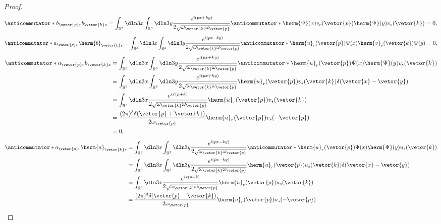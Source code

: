 \begin{proof}
\begin{equation*}
      \anticommutator*{b_{\vetor{p}r}}{b_{\vetor{k}s}} = \int_{\mathbb{R}^3} \dln3x \int_{\mathbb{R}^3} \dln3y \frac{e^{i(px + ky)}}{2\sqrt{\omega_{\vetor{k}} \omega_{\vetor{p}}}} \anticommutator*{\herm{\Psi}(x)v_r(\vetor{p})}{\herm{\Psi}(y)v_s(\vetor{k})} = 0,
   \end{equation*}
   \begin{align*}
      \anticommutator*{a_{\vetor{p}r}}{\herm{b}_{\vetor{k}s}} = \int_{\mathbb{R}^3} \dln3x \int_{\mathbb{R}^3} \dln3y \frac{e^{i(px - ky)}}{2\sqrt{\omega_{\vetor{k}} \omega_{\vetor{p}}}} \anticommutator*{\herm{u}_r(\vetor{p})\Psi(x)}{\herm{v}_s(\vetor{k})\Psi(y)} = 0,
   \end{align*}
   \begin{align*}
      \anticommutator*{a_{\vetor{p}r}}{b_{\vetor{k}s}} 
      &= \int_{\mathbb{R}^3} \dln3x \int_{\mathbb{R}^3} \dln3y \frac{e^{i(px + ky)}}{2\sqrt{\omega_{\vetor{k}} \omega_{\vetor{p}}}} \anticommutator*{\herm{u}_r(\vetor{p})\Psi(x)}{\herm{\Psi}(y)v_s(\vetor{k})}\\
      &= \int_{\mathbb{R}^3} \dln3x \int_{\mathbb{R}^3} \dln3y \frac{e^{i(px + ky)}}{2\sqrt{\omega_{\vetor{k}} \omega_{\vetor{p}}}} \herm{u}_r(\vetor{p}) v_s(\vetor{k}) \delta(\vetor{x} - \vetor{y})\\
      &= \int_{\mathbb{R}^3} \dln3x \frac{e^{ix(p + k)}}{2\sqrt{\omega_{\vetor{k}} \omega_{\vetor{p}}}} \herm{u}_r(\vetor{p}) v_s(\vetor{k})\\
      &= \frac{(2\pi)^3 \delta(\vetor{p} + \vetor{k})}{2 \omega_{\vetor{p}}} \herm{u}_r(\vetor{p}) v_s(-\vetor{p})\\
      &= 0,
   \end{align*}
   \begin{align*}
      \anticommutator*{a_{\vetor{p}r}}{\herm{a}_{\vetor{k}s}} 
      &= \int_{\mathbb{R}^3} \dln3x \int_{\mathbb{R}^3} \dln3y \frac{e^{i(px - ky)}}{2\sqrt{\omega_{\vetor{k}} \omega_{\vetor{p}}}} \anticommutator*{\herm{u}_r(\vetor{p})\Psi(x)}{\herm{\Psi}(y) u_s(\vetor{k})}\\
      &= \int_{\mathbb{R}^3} \dln3x \int_{\mathbb{R}^3} \dln3y \frac{e^{i(px - ky)}}{2\sqrt{\omega_{\vetor{k}} \omega_{\vetor{p}}}} \herm{u}_r(\vetor{p}) u_s(\vetor{k}) \delta(\vetor{x} - \vetor{y})\\
      &= \int_{\mathbb{R}^3} \dln3x \frac{e^{ix(p - k)}}{2\sqrt{\omega_{\vetor{k}} \omega_{\vetor{p}}}} \herm{u}_r(\vetor{p}) u_s(\vetor{k})\\
      &= \frac{(2\pi)^3 \delta(\vetor{p} - \vetor{k})}{2 \omega_{\vetor{p}}} \herm{u}_r(\vetor{p}) u_s(-\vetor{p})\\

\end{align*}
\end{proof}
